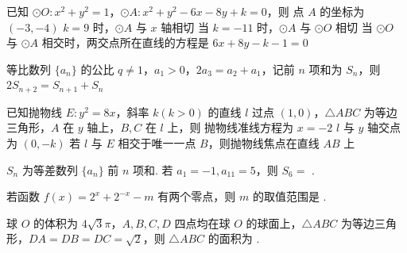 \documentclass[a4paper,11pt]{report}
\begin{document}
\begin{examquestions}[start=9]
\item 已知 $\odot O:x^2+y^2=1$，$\odot A:x^2+y^2-6x-8y+k=0$，则
\onechoices
{点 $A$ 的坐标为 $(-3,-4)$}
{$k=9$ 时，$\odot A$ 与 $x$ 轴相切}
{当 $k=-11$ 时，$\odot A$ 与 $\odot O$ 相切}
{当 $\odot O$ 与 $\odot A$ 相交时，两交点所在直线的方程是 $6x+8y-k-1=0$}

\item 等比数列 $\{a_n\}$ 的公比 $q\neq1$，$a_1>0$，$2a_3=a_2+a_1$，记前 $n$ 项和为 $S_n$，则
\twochoices
{}
{}
{$2S_{n+2}=S_{n+1}+S_n$}
{}

\item 已知抛物线 $E:y^2=8x$，斜率 $k(k>0)$ 的直线 $l$ 过点 $(1,0)$，$\triangle ABC$ 为等边三角形，$A$ 在 $y$ 轴上，$B,C$ 在 $l$ 上，则
\onechoices
{抛物线准线方程为 $x=-2$}
{$l$ 与 $y$ 轴交点为 $(0,-k)$}
{若 $l$ 与 $E$ 相交于唯一一点 $B$，则抛物线焦点在直线 $AB$ 上}
{}
\end{examquestions}

\begin{examquestions}[start=12]
\item $S_n$ 为等差数列 $\{a_n\}$ 前 $n$ 项和. 若 $a_1=-1,a_{11}=5$，则 $S_6=$ \blank.

\item 若函数 $f(x)=2^x+2^{-x}-m$ 有两个零点，则 $m$ 的取值范围是 \blank.

\item 球 $O$ 的体积为 $4\sqrt3\pi$，$A,B,C,D$ 四点均在球 $O$ 的球面上，$\triangle ABC$ 为等边三角形，$DA=DB=DC=\sqrt2$，则 $\triangle ABC$ 的面积为 \blank.
\end{examquestions}
\end{document}

